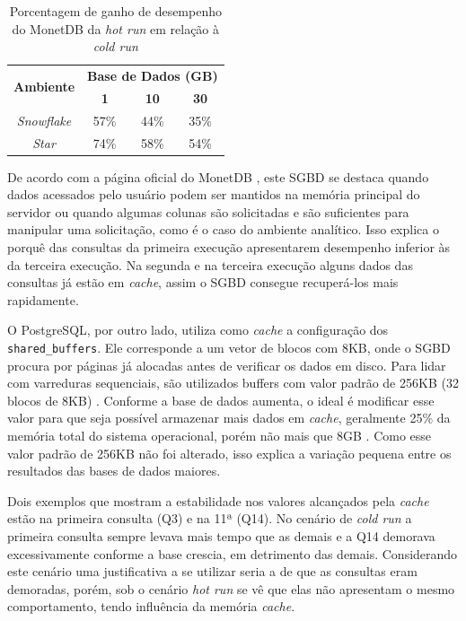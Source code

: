 \begin{table}[htpb]
        \centering
        \caption{Porcentagem de ganho de desempenho do MonetDB da \textit{hot run} em relação à \textit{cold run}}
        \label{tab:ganho_monet_cold_hot}
        \begin{tabular}{|c|c|c|c|}
        \hline
        \multirow{2}{*}{\textbf{Ambiente}} & \multicolumn{3}{c|}{\textbf{Base de Dados (GB)}} \\ \cline{2-4} 
        & \textbf{1}     & \textbf{10}    & \textbf{30}    \\ \hline
        \textit{Snowflake}                 & 57\%           & 44\%           & 35\%           \\ \hline
        \textit{Star}                      & 74\%           & 58\%           & 54\%           \\ \hline
        \end{tabular}
\end{table}

De acordo com a página oficial do MonetDB \cite{monetdb2017c}, este SGBD se destaca quando dados acessados pelo usuário podem ser mantidos na memória principal do servidor ou quando algumas colunas são solicitadas e são suficientes para manipular uma solicitação, como é o caso do ambiente analítico. Isso explica o porquê das consultas da primeira execução apresentarem desempenho inferior às da terceira execução. Na segunda e na terceira execução alguns dados das consultas já estão em \textit{cache}, assim o SGBD consegue recuperá-los mais rapidamente.

O PostgreSQL, por outro lado, utiliza como \textit{cache} a configuração dos \texttt{shared\_buffers}. Ele corresponde a um vetor de blocos com 8KB, onde o SGBD procura por páginas já alocadas antes de verificar os dados em disco. Para lidar com varreduras sequenciais, são utilizados buffers com valor padrão de 256KB (32 blocos de 8KB) \cite{psqlcache2018r}. Conforme a base de dados aumenta, o ideal é modificar esse valor para que seja possível armazenar mais dados em \textit{cache}, geralmente 25\% da memória total do sistema operacional, porém não mais que 8GB \cite{psql2018conf}. Como esse valor padrão de 256KB não foi alterado, isso explica a variação pequena entre os resultados das bases de dados maiores.

Dois exemplos que mostram a estabilidade nos valores alcançados pela \textit{cache} estão na primeira consulta (Q3) e na 11ª (Q14). No cenário de \textit{cold run} a primeira consulta sempre levava mais tempo que as demais e a Q14 demorava excessivamente conforme a base crescia, em detrimento das demais. Considerando este cenário uma justificativa a se utilizar seria a de que as consultas eram demoradas, porém, sob o cenário \textit{hot run} se vê que elas não apresentam o mesmo comportamento, tendo influência da memória \textit{cache}.

